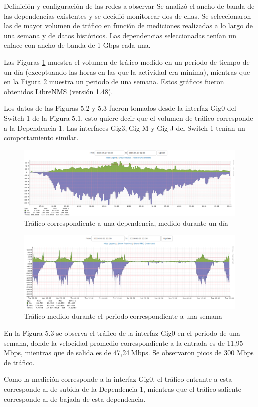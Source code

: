    \begin{subsection}{Definición y configuración de las redes a observar}
    Se analizó el ancho de banda de las dependencias existentes y se decidió monitorear dos de ellas. Se seleccionaron las de mayor volumen de tráfico en función de mediciones realizadas a lo largo de una semana y de datos históricos. Las dependencias seleccionadas tenían un enlace con ancho de banda de 1 Gbps cada una. \par
    Las Figuras \ref{fig:figura_35_trafico_dia} muestra el volumen de tráfico medido en un periodo de tiempo de un día (exceptuando las horas en las que la actividad era mínima), mientras que en la Figura \ref{fig:figura_36_trafico_semana} muestra un periodo de una semana. Estos gráficos fueron obtenidos LibreNMS \cite{librenms} (versión 1.48).\par
    Los datos de las Figuras 5.2 y 5.3 fueron tomados desde la interfaz Gig0 del Switch 1 de la Figura 5.1, esto quiere decir que el volumen de tráfico corresponde a la Dependencia 1. Las interfaces Gig3, Gig-M y Gig-J del Switch 1 tenían un comportamiento similar.\par
    \begin{figure}[H]
    \centering
    \includegraphics[width=1\textwidth]{./iteracion_1_imagenes/figura_35_trafico_dia.png}
    \caption{Tráfico correspondiente a una dependencia, medido durante un día }
    \label{fig:figura_35_trafico_dia}
    \end{figure}
    \begin{figure}[H]
    \centering
    \includegraphics[width=1\textwidth]{./iteracion_1_imagenes/figura_36_trafico_semana_editada.png}
    \caption{Tráfico medido durante el periodo correspondiente a una semana}
    \label{fig:figura_36_trafico_semana}
    \end{figure}
    \FloatBarrier
    En la Figura 5.3 se observa el tráfico de la interfaz Gig0 en el periodo de una semana, donde la velocidad promedio correspondiente a la entrada es de 11,95 Mbps, mientras que de salida es de 47,24 Mbps. Se observaron picos de 300 Mbps de tráfico.\par
    Como la medición corresponde a la interfaz Gig0, el tráfico entrante a esta corresponde al de subida de la Dependencia 1, mientras que el tráfico saliente corresponde al de bajada de esta dependencia.
    \end{subsection}
